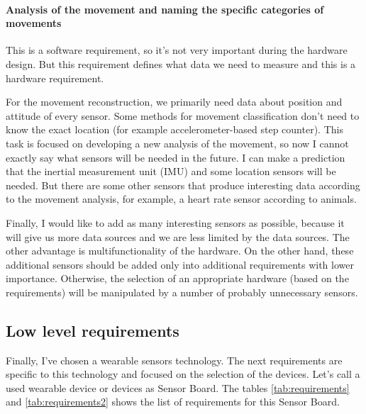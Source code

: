 \paragraph{Analysis of the movement and naming the specific categories of movements} This is a software requirement, so it's not very important during the hardware design. But this requirement defines what data we need to measure and this is a hardware requirement.

For the movement reconstruction, we primarily need data about position and attitude of every sensor. Some methods for movement classification don't need to know the exact location (for example accelerometer-based step counter). This task is focused on developing a new analysis of the movement, so now I cannot exactly say what sensors will be needed in the future. I can make a prediction that the inertial measurement unit (\ac{IMU}) and some location sensors will be needed. But there are some other sensors that produce interesting data according to the movement analysis, for example, a heart rate sensor according to animals.

Finally, I would like to add as many interesting sensors as possible, because it will give us more data sources and we are less limited by the data sources. The other advantage is multifunctionality of the hardware. On the other hand, these additional sensors should be added only into additional requirements with lower importance. Otherwise, the selection of an appropriate hardware (based on the requirements) will be manipulated by a number of probably unnecessary sensors.

\subsection{Low level requirements}
Finally, I've chosen a wearable sensors technology. The next requirements are specific to this technology and focused on the selection of the devices. Let's call a used wearable device or devices as Sensor Board. The tables \ref{tab:requirements} and \ref{tab:requirements2} shows the list of requirements for this Sensor Board.

